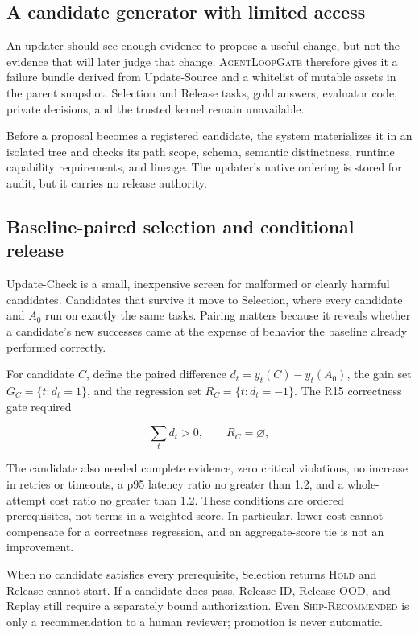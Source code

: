 \documentclass[10pt,twocolumn]{article}
\newcommand{\system}{\textsc{AgentLoopGate}\xspace}
\newcommand{\hold}{\textsc{Hold}\xspace}
\newcommand{\ship}{\textsc{Ship-Recommended}\xspace}
\begin{document}
\subsection{A candidate generator with limited access}

An updater should see enough evidence to propose a useful change, but not the
evidence that will later judge that change. \system therefore gives it a
failure bundle derived from Update-Source and a whitelist of mutable assets in
the parent snapshot. Selection and Release tasks, gold answers, evaluator
code, private decisions, and the trusted kernel remain unavailable.

Before a proposal becomes a registered candidate, the system materializes it
in an isolated tree and checks its path scope, schema, semantic distinctness,
runtime capability requirements, and lineage. The updater's native ordering is
stored for audit, but it carries no release authority.

\subsection{Baseline-paired selection and conditional release}

Update-Check is a small, inexpensive screen for malformed or clearly harmful
candidates. Candidates that survive it move to Selection, where every
candidate and $A_0$ run on exactly the same tasks. Pairing matters because it
reveals whether a candidate's new successes came at the expense of behavior
the baseline already performed correctly.

For candidate $C$, define the paired difference
$d_t=y_t(C)-y_t(A_0)$, the gain set $G_C=\{t:d_t=1\}$, and the regression set
$R_C=\{t:d_t=-1\}$. The R15 correctness gate required

\begin{equation}
\sum_t d_t > 0, \qquad R_C=\varnothing,
\label{eq:correctness}
\end{equation}

The candidate also needed complete evidence, zero critical violations, no
increase in retries or timeouts, a p95 latency ratio no greater than 1.2, and a
whole-attempt cost ratio no greater than 1.2. These conditions are ordered
prerequisites, not terms in a weighted score. In particular, lower cost cannot
compensate for a correctness regression, and an aggregate-score tie is not an
improvement.

When no candidate satisfies every prerequisite, Selection returns \hold and
Release cannot start. If a candidate does pass, Release-ID, Release-OOD, and
Replay still require a separately bound authorization. Even \ship is only a
recommendation to a human reviewer; promotion is never automatic.
\end{document}
